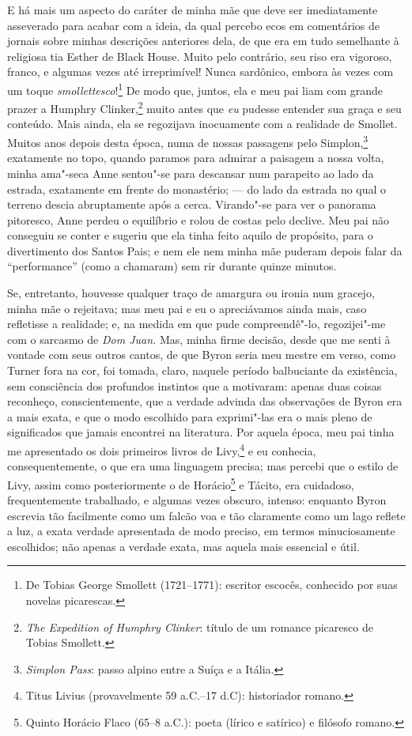 E há mais um aspecto do caráter de minha mãe que deve ser
imediatamente asseverado para acabar com a ideia, da qual percebo ecos
em comentários de jornais sobre minhas descrições anteriores dela, de
que era em tudo semelhante à religiosa tia Esther de Black House. Muito
pelo contrário, seu riso era vigoroso, franco, e algumas vezes até
irreprimível! Nunca sardônico, embora às vezes com um toque
\textit{smollettesco}!\footnote{De Tobias George Smollett (1721--1771):
  escritor escocês, conhecido por suas novelas picarescas.} De modo que, juntos, ela e meu pai liam com grande prazer a
Humphry Clinker,\footnote{\textit{The Expedition of Humphry Clinker}:
  título de um romance picaresco de Tobias Smollett.}
muito antes que \textit{eu} pudesse entender sua graça e seu conteúdo.
Mais ainda, ela se regozijava inocuamente com a realidade de Smollet.
Muitos anos depois desta época, numa de nossas passagens pelo
Simplon,\footnote{\textit{Simplon Pass}: passo alpino entre a Suíça e a
  Itália.} exatamente no topo, quando paramos para
admirar a paisagem a nossa volta, minha ama"-seca Anne sentou"-se para
descansar num parapeito ao lado da estrada, exatamente em frente do
monastério; --- do lado da estrada no qual o terreno descia abruptamente
após a cerca. Virando"-se para ver o panorama pitoresco, Anne perdeu o
equilíbrio e rolou de costas pelo declive. Meu pai não conseguiu se
conter e sugeriu que ela tinha feito aquilo de propósito, para o
divertimento dos Santos Pais; e nem ele nem minha mãe puderam depois
falar da ``performance'' (como a chamaram) sem rir durante quinze
minutos.

Se, entretanto, houvesse qualquer traço de amargura ou ironia num
gracejo, minha mãe o rejeitava; mas meu pai e eu o apreciávamos ainda
mais, caso refletisse a realidade; e, na medida em que pude
compreendê"-lo, regozijei"-me com o sarcasmo de \textit{Dom Juan.} Mas,
minha firme decisão, desde que me senti à vontade com seus outros
cantos, de que Byron seria meu mestre em verso, como Turner fora na cor,
foi tomada, claro, naquele período balbuciante da existência, sem
consciência dos profundos instintos que a motivaram: apenas duas coisas
reconheço, conscientemente, que a verdade advinda das observações de
Byron era a mais exata, e que o modo escolhido para exprimi"-las era o
mais pleno de significados que jamais encontrei na literatura. Por
aquela época, meu pai tinha me apresentado os dois primeiros livros de
Livy,\footnote{Titus Livius (provavelmente 59 a.C.--17 d.C):
  historiador romano.} e eu conhecia, consequentemente,
o que era uma linguagem precisa; mas percebi que o estilo de Livy, assim
como posteriormente o de Horácio\footnote{Quinto Horácio Flaco (65--8 a.C.): poeta (lírico e satírico) e filósofo romano.} e Tácito, era cuidadoso, frequentemente trabalhado, e algumas
vezes obscuro, intenso: enquanto Byron escrevia tão facilmente como um
falcão voa e tão claramente como um lago reflete a luz, a exata verdade
apresentada de modo preciso, em termos minuciosamente escolhidos; não
apenas a verdade exata, mas aquela mais essencial e útil.


